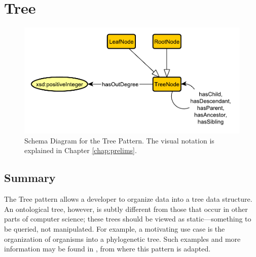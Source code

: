 \section{Tree}
\label{sec:Tree}
\begin{figure}[h!]
\begin{center}
\includegraphics[width=.8\textwidth]{figures/tree}
\end{center}
\caption{Schema Diagram for the Tree Pattern. The visual notation is explained in Chapter \ref{chap:prelims}.}
\label{fig:Tree}
\end{figure}
\subsection{Summary}
\label{sum:Tree}
The \textsf{Tree} pattern allows a developer to organize data into a tree data structure. An ontological tree, however, is subtly different from those that occur in other parts of computer science; these trees should be viewed as static---something to be queried, not manipulated. For example, a motivating use case is the organization of organisms into a phylogenetic tree. Such examples and more information may be found in \cite{tree}, from where this pattern is adapted.

